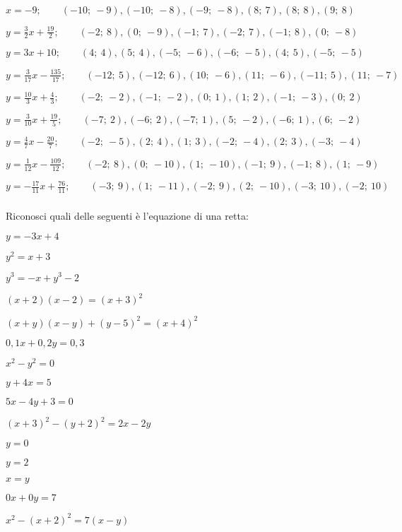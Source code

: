 \begin{esercizio}
\begin{enumeratea}
  \item  $x = -9;\quad \quad (-10;~-9), (-10;~-8), (-9;~-8), (8;~7), (8;~8), (9;~8)$
  \item  $y = \frac{3}{2} x +\frac{19}{2};\quad \quad (-2;~8), (0;~-9), (-1;~7), (-2;~7), (-1;~8), (0;~-8)$
  \item  $y = 3 x +10;\quad \quad (4;~4), (5;~4), (-5;~-6), (-6;~-5), (4;~5), (-5;~-5)$
  \item  $y = \frac{3}{17} x -\frac{135}{17};\quad \quad (-12;~5), (-12;~6), (10;~-6), (11;~-6), (-11;~5), (11;~-7)$
  \item  $y = \frac{10}{3} x +\frac{4}{3};\quad \quad (-2;~-2), (-1;~-2), (0;~1), (1;~2), (-1;~-3), (0;~2)$
  \item  $y = \frac{3}{10} x +\frac{19}{5};\quad \quad (-7;~2), (-6;~2), (-7;~1), (5;~-2), (-6;~1), (6;~-2)$
  \item  $y = \frac{4}{7} x -\frac{20}{7};\quad \quad (-2;~-5), (2;~4), (1;~3), (-2;~-4), (2;~3), (-3;~-4)$
  \item  $y = \frac{1}{12} x -\frac{109}{12};\quad \quad (-2;~8), (0;~-10), (1;~-10), (-1;~9), (-1;~8), (1;~-9)$
  \item  $y = -\frac{17}{11} x +\frac{76}{11};\quad \quad (-3;~9), (1;~-11), (-2;~9), (2;~-10), (-3;~10), (-2;~10)$
 \end{enumeratea}
\end{esercizio}

\subsubsection*{}

\begin{esercizio}\label{ese:02_01.} %
Riconosci quali delle seguenti è l'equazione di una retta:
 \begin{enumeratea}
  \item  $ y = -3 x +4$
  \item  $ y^2 = x + 3$
  \item  $ y^3 = -x + y^3 -2$
  \item  $ (x +2)(x-2)=(x +3)^2$
  \item  $ (x +y)(x-y) + (y-5)^2 = (x +4)^2$
  \item  $ 0,1 x + 0,2 y = 0,3$
  \item  $ x^2 - y^2 = 0$
  \item  $ y +4 x = 5$
  \item  $ 5 x -4 y+3 = 0$
  \item  $ (x+3)^2 - (y+2)^2 = 2 x - 2y$
  \item  $ y = 0$
  \item  $ y = 2$
  \item  $ x = y$
  \item  $ 0 x + 0 y = 7$
  \item  $ x^2 -(x+2)^2 = 7 (x -y)$
 \end{enumeratea}
\end{esercizio}

